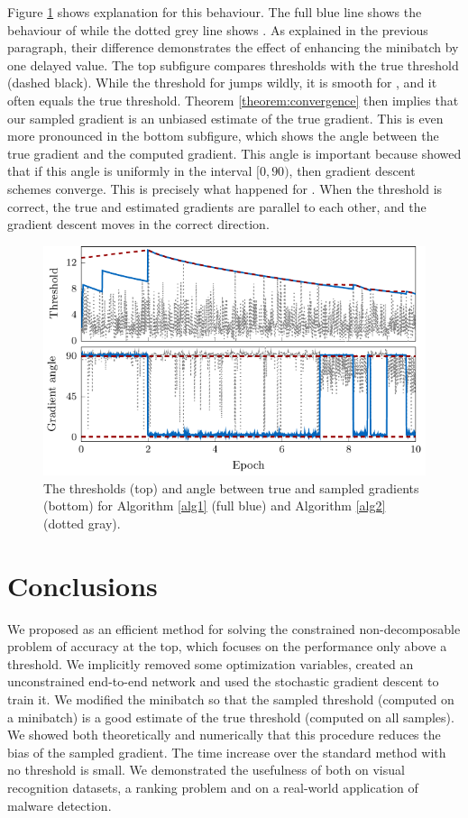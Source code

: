 Figure \ref{fig:thresholds2} shows explanation for this behaviour. The full blue line shows the behaviour of \DeepTopPush while the dotted grey line shows \PatMatNP. As explained in the previous paragraph, their difference demonstrates the effect of enhancing the minibatch by one delayed value. The top subfigure compares thresholds with the true threshold (dashed black). While the threshold for \PatMatNP jumps wildly, it is smooth for \DeepTopPush, and it often equals the true threshold. Theorem \ref{theorem:convergence} then implies that our sampled gradient is an unbiased estimate of the true gradient. This is even more pronounced in the bottom subfigure, which shows the angle between the true gradient and the computed gradient. This angle is important because \cite{nocedal2006numerical} showed that if this angle is uniformly in the interval $[0,90)$, then gradient descent schemes converge. This is precisely what happened for \DeepTopPush. When the threshold is correct, the true and estimated gradients are parallel to each other, and the gradient descent moves in the correct direction.

\begin{figure}[!ht]
  \centering
  \includegraphics[width = \linewidth]{images/deep_thresholds.pdf}
  \caption{The thresholds (top) and angle between true and sampled gradients (bottom) for Algorithm \ref{alg1} (full blue) and Algorithm \ref{alg2} (dotted gray).}
  \label{fig:thresholds2}
\end{figure}

\section{Conclusions}

We proposed \DeepTopPush as an efficient method for solving the constrained non-decomposable problem of accuracy at the top, which focuses on the performance only above a threshold. We implicitly removed some optimization variables, created an unconstrained end-to-end network and used the stochastic gradient descent to train it. We modified the minibatch so that the sampled threshold (computed on a minibatch) is a good estimate of the true threshold (computed on all samples). We showed both theoretically and numerically that this procedure reduces the bias of the sampled gradient. The time increase over the standard method with no threshold is small. We demonstrated the usefulness of \DeepTopPush both on visual recognition datasets, a ranking problem and on a real-world application of malware detection.
